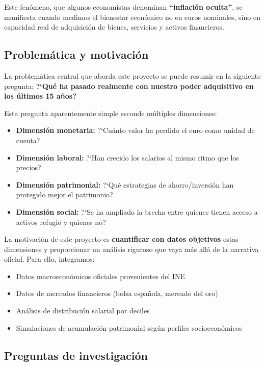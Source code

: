 \documentclass{article}
\begin{document}
Este fen\'omeno, que algunos economistas denominan \textbf{``inflaci\'on oculta''}, se manifiesta cuando medimos el bienestar econ\'omico no en euros nominales, sino en capacidad real de adquisici\'on de bienes, servicios y activos financieros.

\subsection{Problem\'atica y motivaci\'on}

La problem\'atica central que aborda este proyecto se puede resumir en la siguiente pregunta: \textbf{?`Qu\'e ha pasado realmente con nuestro poder adquisitivo en los \'ultimos 15 a\~nos?}

Esta pregunta aparentemente simple esconde m\'ultiples dimensiones:

\begin{itemize}
    \item \textbf{Dimensi\'on monetaria:} ?`Cu\'anto valor ha perdido el euro como unidad de cuenta?
    \item \textbf{Dimensi\'on laboral:} ?`Han crecido los salarios al mismo ritmo que los precios?
    \item \textbf{Dimensi\'on patrimonial:} ?`Qu\'e estrategias de ahorro/inversi\'on han protegido mejor el patrimonio?
    \item \textbf{Dimensi\'on social:} ?`Se ha ampliado la brecha entre quienes tienen acceso a activos refugio y quienes no?
\end{itemize}

La motivaci\'on de este proyecto es \textbf{cuantificar con datos objetivos} estas dimensiones y proporcionar un an\'alisis riguroso que vaya m\'as all\'a de la narrativa oficial. Para ello, integramos:

\begin{itemize}
    \item Datos macroecon\'omicos oficiales provenientes del INE
    \item Datos de mercados financieros (bolsa espa\~nola, mercado del oro)
    \item An\'alisis de distribuci\'on salarial por deciles
    \item Simulaciones de acumulaci\'on patrimonial seg\'un perfiles socioecon\'omicos
\end{itemize}

\subsection{Preguntas de investigaci\'on}
\end{document}

